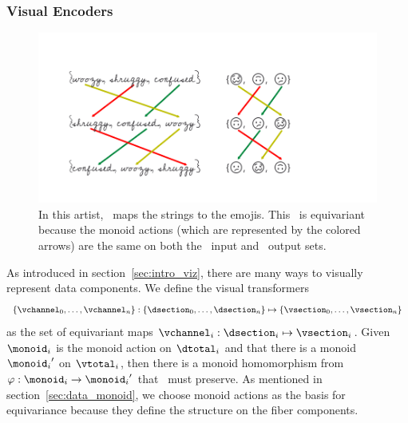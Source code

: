 \documentclass[../main.tex]{subfiles}
\begin{document}
\subsubsection{Visual Encoders \vchannel}
\label{sec:artist_nu}
\begin{figure}[H]
    \includegraphics[width=\textwidth]{figures/math/equivariance_nu.png}
    \caption{In this artist, \vchannel\ maps the strings to the emojis. This \vchannel\ is equivariant because the monoid actions (which are represented by the colored arrows) are the same on both the \dsection\ input and \vsection\ output sets.}
    \label{fig:artist_nu}
\end{figure}
As introduced in section~\ref{sec:intro_viz}, there are many ways to visually represent data components. We define the visual transformers \vchannel\ 
\begin{equation}
    \label{eq:nu_expanded}
    \{\vchannel_{0}, \ldots, \vchannel_{n}\}: \{\dsection_{0}, \ldots, \dsection_{n}\} \mapsto \{\vsection_{0}, \ldots, \vsection_{n}\}
\end{equation}
as the set of equivariant maps $\vchannel_i: \dsection_i \mapsto \vsection_i$. Given $\monoid_i$ is the monoid action on $\dtotal_i$ and that there is a monoid ${\monoid_i}^{\prime}$ on $\vtotal_i$, then there is a monoid homomorphism from $\varphi:\monoid_i \rightarrow {\monoid_i}^{\prime}$ that \vchannel\ must preserve. As mentioned in section~\ref{sec:data_monoid}, we choose monoid actions as the basis for equivariance because they define the structure on the fiber components.  
\end{document}
